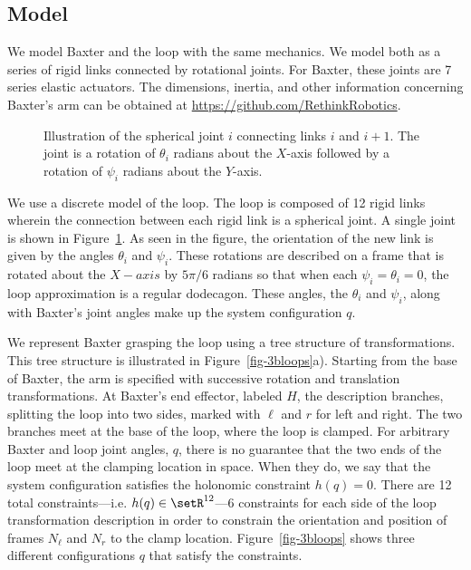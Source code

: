 \documentclass[letterpaper, 10pt, conference]{ieeeconf}
\begin{document}
\subsection{Model}
We model Baxter and the loop with the same mechanics.  We model both as a series of rigid links connected by rotational joints.  For Baxter, these joints are 7 series elastic actuators.  The dimensions,  inertia, and other information concerning Baxter's arm can be obtained at \url{https://github.com/RethinkRobotics}.  

\begin{figure}
\centering
\def\svgwidth{.97\textwidth}%

\caption{Illustration of the spherical joint $i$ connecting links $i$ and $i+1$.  The joint is a rotation of $\theta_i$ radians about the $X$-axis followed by a rotation of $\psi_i$ radians about the $Y$-axis. }
\label{fig-loop_link}
\end{figure}

We use a discrete model of the loop.  The loop is composed of 12 rigid links wherein the connection between each rigid link is a spherical joint.  A single joint is shown in Figure~\ref{fig-loop_link}.  As seen in the figure, the orientation of the new link is given by the angles $\theta_i$ and $\psi_i$.  These rotations are described on a frame that is rotated about the $X-axis$ by $5\pi/6$ radians so that when each $\psi_i = \theta_i = 0$, the loop approximation is a regular dodecagon.  These angles, the $\theta_i$ and $\psi_i$, along with Baxter's joint angles make up the system configuration $q$.  

We represent Baxter grasping the loop using a tree structure of transformations.  This tree structure is illustrated in Figure~\ref{fig-3bloops}a).  Starting from the base of Baxter, the arm is specified with successive rotation and translation transformations.  At Baxter's end effector, labeled $H$, the description branches, splitting the loop into two sides, marked with $\ell$ and $r$ for left and right.  The two branches meet at the base of the loop, where the loop is clamped.  For arbitrary Baxter and loop joint angles, $q$, there is no guarantee that the two ends of the loop meet at the clamping location in space.  When they do, we say that the system configuration satisfies the holonomic constraint $h(q) = 0$.  There are 12 total constraints---i.e. $h(q)\in\setR^{12}$---6 constraints for each side of the loop transformation description in order to constrain the orientation and position of frames $N_\ell$ and $N_r$ to the clamp location.  Figure~\ref{fig-3bloops} shows three different configurations $q$ that satisfy the constraints.
\end{document}
